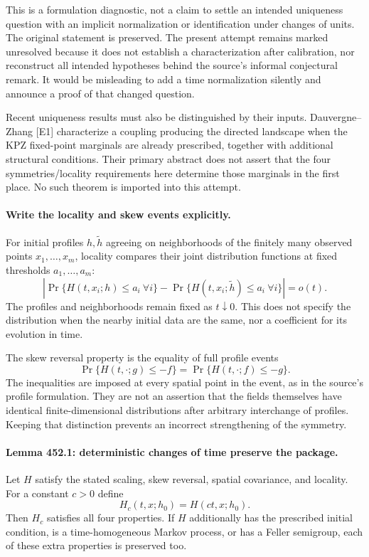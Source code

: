 \documentclass[11pt]{article}
\begin{document}
This is a formulation diagnostic, not a claim to settle an intended
uniqueness question with an implicit normalization or identification
under changes of units. The original statement is preserved. The present
attempt remains marked unresolved because it does not establish a
characterization after calibration, nor reconstruct all intended
hypotheses behind the source's informal conjectural remark. It would be
misleading to add a time normalization silently and announce a proof of
that changed question.

Recent uniqueness results must also be distinguished by their inputs.
Dauvergne--Zhang [E1] characterize a coupling producing the directed
landscape when the KPZ fixed-point marginals are already prescribed,
together with additional structural conditions. Their primary abstract
does not assert that the four symmetries/locality requirements here
determine those marginals in the first place. No such theorem is imported
into this attempt.

\paragraph{Write the locality and skew events explicitly.}
For initial profiles $h,\widetilde h$ agreeing on neighborhoods of the
finitely many observed points $x_1,\ldots,x_m$, locality compares their
joint distribution functions at fixed thresholds $a_1,\ldots,a_m$:
\[
 \left|\Pr\{H(t,x_i;h)\le a_i\ \forall i\}
       -\Pr\{H(t,x_i;\widetilde h)\le a_i\ \forall i\}\right|=o(t).
\]
The profiles and neighborhoods remain fixed as $t\downarrow0$. This
does not specify the distribution when the nearby initial data are the
same, nor a coefficient for its evolution in time.

The skew reversal property is the equality of full profile events
\begin{equation}\label{a452:skew}
 \Pr\{H(t,\cdot;g)\le-f\}
       =\Pr\{H(t,\cdot;f)\le-g\}.
\end{equation}
The inequalities are imposed at every spatial point in the event, as in
the source's profile formulation. They are not an assertion that the
fields themselves have identical finite-dimensional distributions after
arbitrary interchange of profiles. Keeping that distinction prevents an
incorrect strengthening of the symmetry.

\paragraph{Lemma 452.1: deterministic changes of time preserve the package.}
Let $H$ satisfy the stated scaling, skew reversal, spatial covariance,
and locality. For a constant $c>0$ define
\[
 H_c(t,x;h_0)=H(ct,x;h_0).
\]
Then $H_c$ satisfies all four properties. If $H$ additionally has the
prescribed initial condition, is a time-homogeneous Markov process, or
has a Feller semigroup, each of these extra properties is preserved too.
\end{document}
